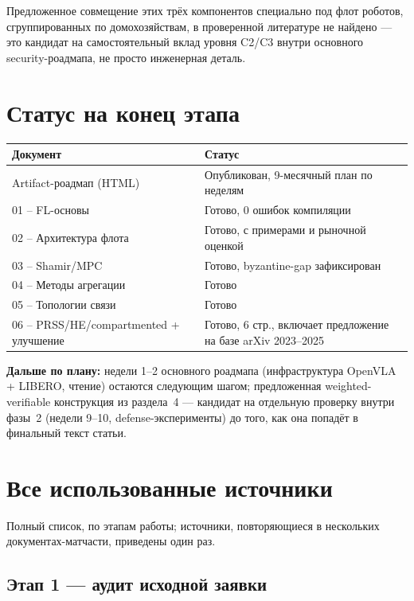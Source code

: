 \documentclass[11pt]{article}
\begin{document}
Предложенное совмещение этих трёх компонентов специально под флот роботов,
сгруппированных по домохозяйствам, в проверенной литературе не найдено — это
кандидат на самостоятельный вклад уровня C2/C3 внутри основного security-роадмапа,
не просто инженерная деталь.

\section{Статус на конец этапа}

\begin{center}
\begin{tabular}{@{}p{5.5cm}p{9.4cm}@{}}
\toprule
Документ & Статус \\
\midrule
Artifact-роадмап (HTML) & Опубликован, 9-месячный план по неделям \\
01 -- FL-основы & Готово, 0 ошибок компиляции \\
02 -- Архитектура флота & Готово, с примерами и рыночной оценкой \\
03 -- Shamir/MPC & Готово, byzantine-gap зафиксирован \\
04 -- Методы агрегации & Готово \\
05 -- Топологии связи & Готово \\
06 -- PRSS/HE/compartmented + улучшение & Готово, 6 стр., включает предложение
  на базе arXiv 2023--2025 \\
\bottomrule
\end{tabular}
\end{center}

\textbf{Дальше по плану:} недели 1--2 основного роадмапа (инфраструктура OpenVLA +
LIBERO, чтение) остаются следующим шагом; предложенная weighted-verifiable
конструкция из раздела~4 — кандидат на отдельную проверку внутри фазы~2 (недели
9--10, defense-эксперименты) до того, как она попадёт в финальный текст статьи.

\section{Все использованные источники}

Полный список, по этапам работы; источники, повторяющиеся в нескольких
документах-матчасти, приведены один раз.

\subsection*{Этап 1 --- аудит исходной заявки}
\end{document}
